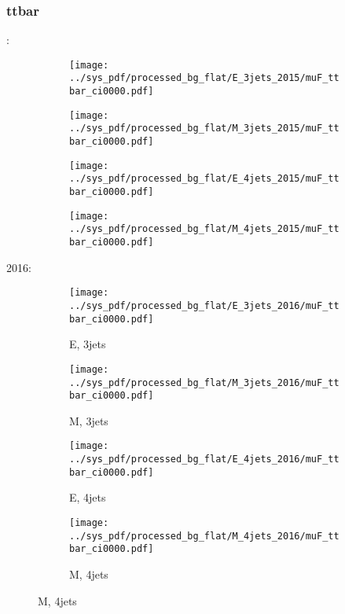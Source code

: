 \documentclass{beamer}
\begin{document}
\begin{frame}
\frametitle{ttbar}
\fontsize{5}{1}:
\begin{figure}
\centering
\begin{subfigure}[b]{0.24\textwidth}
\texttt{[image: ../sys\_pdf/processed\_bg\_flat/E\_3jets\_2015/muF\_ttbar\_ci0000.pdf]}
\end{subfigure}
\begin{subfigure}[b]{0.24\textwidth}
\texttt{[image: ../sys\_pdf/processed\_bg\_flat/M\_3jets\_2015/muF\_ttbar\_ci0000.pdf]}
\end{subfigure}
\begin{subfigure}[b]{0.24\textwidth}
\texttt{[image: ../sys\_pdf/processed\_bg\_flat/E\_4jets\_2015/muF\_ttbar\_ci0000.pdf]}
\end{subfigure}
\begin{subfigure}[b]{0.24\textwidth}
\texttt{[image: ../sys\_pdf/processed\_bg\_flat/M\_4jets\_2015/muF\_ttbar\_ci0000.pdf]}
\end{subfigure}
\end{figure}
2016:
\begin{figure}
\centering
\begin{subfigure}[b]{0.24\textwidth}
\texttt{[image: ../sys\_pdf/processed\_bg\_flat/E\_3jets\_2016/muF\_ttbar\_ci0000.pdf]}
\captionsetup{font=tiny}
\caption{E, 3jets}
\end{subfigure}
\begin{subfigure}[b]{0.24\textwidth}
\texttt{[image: ../sys\_pdf/processed\_bg\_flat/M\_3jets\_2016/muF\_ttbar\_ci0000.pdf]}
\captionsetup{font=tiny}
\caption{M, 3jets}
\end{subfigure}
\begin{subfigure}[b]{0.24\textwidth}
\texttt{[image: ../sys\_pdf/processed\_bg\_flat/E\_4jets\_2016/muF\_ttbar\_ci0000.pdf]}
\captionsetup{font=tiny}
\caption{E, 4jets}
\end{subfigure}
\begin{subfigure}[b]{0.24\textwidth}
\texttt{[image: ../sys\_pdf/processed\_bg\_flat/M\_4jets\_2016/muF\_ttbar\_ci0000.pdf]}
\captionsetup{font=tiny}
\caption{M, 4jets}
\end{subfigure}
\end{figure}
\end{frame}
\end{document}
